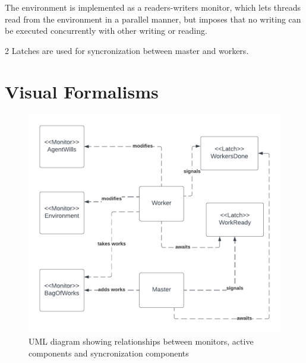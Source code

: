 \documentclass[12pt, a4paper]{report}
\begin{document}
The environment is implemented as a readers-writers monitor, which
 lets threads read from the environment in a parallel manner, but imposes
 that no writing can be executed concurrently with other writing or reading.

2 Latches are used for syncronization between master and workers.

\section{Visual Formalisms}

\begin{figure}
    \centering
    \includegraphics{UML1.png}
    \caption{UML diagram showing relationships between monitors, active components and syncronization components}
\end{figure}
\end{document}
